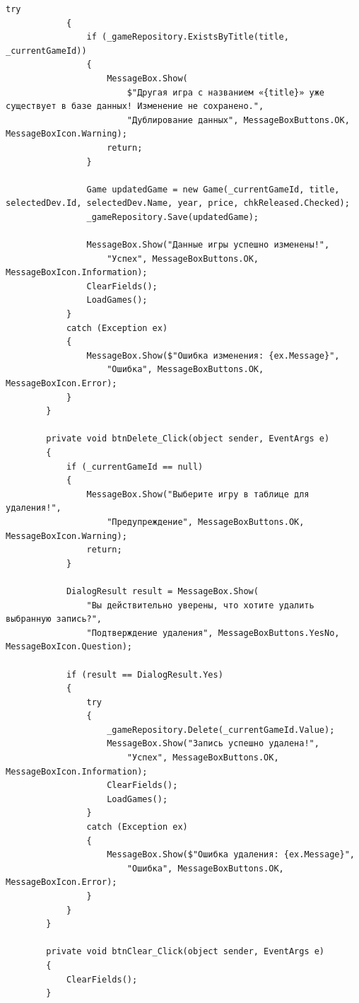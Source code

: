 \documentclass[oneside,a4paper,14pt]{extarticle}
\begin{document}
\begin{lstlisting}[language={[Sharp]C}]
            try
            {
                if (_gameRepository.ExistsByTitle(title, _currentGameId))
                {
                    MessageBox.Show(
                        $"Другая игра с названием «{title}» уже существует в базе данных! Изменение не сохранено.",
                        "Дублирование данных", MessageBoxButtons.OK, MessageBoxIcon.Warning);
                    return;
                }

                Game updatedGame = new Game(_currentGameId, title, selectedDev.Id, selectedDev.Name, year, price, chkReleased.Checked);
                _gameRepository.Save(updatedGame);

                MessageBox.Show("Данные игры успешно изменены!",
                    "Успех", MessageBoxButtons.OK, MessageBoxIcon.Information);
                ClearFields();
                LoadGames();
            }
            catch (Exception ex)
            {
                MessageBox.Show($"Ошибка изменения: {ex.Message}",
                    "Ошибка", MessageBoxButtons.OK, MessageBoxIcon.Error);
            }
        }

        private void btnDelete_Click(object sender, EventArgs e)
        {
            if (_currentGameId == null)
            {
                MessageBox.Show("Выберите игру в таблице для удаления!",
                    "Предупреждение", MessageBoxButtons.OK, MessageBoxIcon.Warning);
                return;
            }

            DialogResult result = MessageBox.Show(
                "Вы действительно уверены, что хотите удалить выбранную запись?",
                "Подтверждение удаления", MessageBoxButtons.YesNo, MessageBoxIcon.Question);

            if (result == DialogResult.Yes)
            {
                try
                {
                    _gameRepository.Delete(_currentGameId.Value);
                    MessageBox.Show("Запись успешно удалена!",
                        "Успех", MessageBoxButtons.OK, MessageBoxIcon.Information);
                    ClearFields();
                    LoadGames();
                }
                catch (Exception ex)
                {
                    MessageBox.Show($"Ошибка удаления: {ex.Message}",
                        "Ошибка", MessageBoxButtons.OK, MessageBoxIcon.Error);
                }
            }
        }

        private void btnClear_Click(object sender, EventArgs e)
        {
            ClearFields();
        }


\end{lstlisting}
\end{document}
